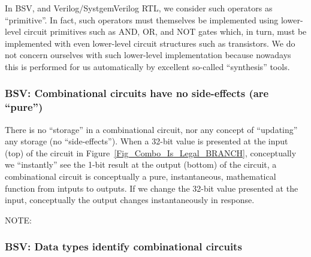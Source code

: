 In BSV, and Verilog/SystgemVerilog RTL, we consider such operators as
``primitive''.  In fact, such operators must themselves be implemented
using lower-level circuit primitives such as AND, OR, and NOT gates
which, in turn, must be implemented with even lower-level circuit
structures such as transistors.  We do not concern ourselves with such
lower-level implementation because nowadays this is performed for us
automatically by excellent so-called ``synthesis'' tools.


\subsubsection{BSV: Combinational circuits have no side-effects (are ``pure'')}


There is no ``storage'' in a combinational circuit, nor any concept of
``updating'' any storage (no ``side-effects'').  When a 32-bit value
is presented at the input (top) of the circuit in
Figure~\ref{Fig_Combo_Is_Legal_BRANCH}, conceptually we
``instantly'' see the 1-bit result at the output (bottom) of the
circuit, {\ie} a combinational circuit is conceptually a pure,
instantaneous, mathematical function from intputs to outputs.  If we
change the 32-bit value presented at the input, conceptually the
output changes instantaneously in response.


NOTE: 



\subsubsection{BSV: Data types identify combinational circuits}

